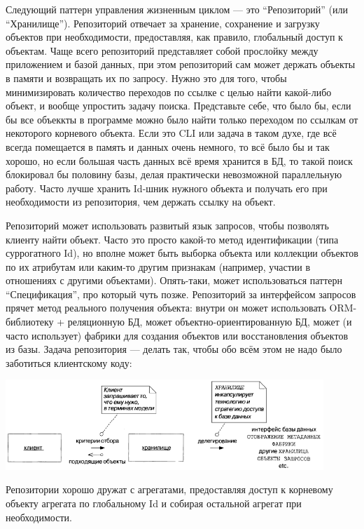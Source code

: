 \documentclass[a5paper]{article}
\begin{document}
Следующий паттерн управления жизненным циклом --- это ``Репозиторий'' (или ``Хранилище''). Репозиторий отвечает за хранение, сохранение и загрузку объектов при необходимости, предоставляя, как правило, глобальный доступ к объектам. Чаще всего репозиторий представляет собой прослойку между приложением и базой данных, при этом репозиторий сам может держать объекты в памяти и возвращать их по запросу. Нужно это для того, чтобы минимизировать количество переходов по ссылке с целью найти какой-либо объект, и вообще упростить задачу поиска. Представьте себе, что было бы, если бы все объеккты в программе можно было найти только переходом по ссылкам от некоторого корневого объекта. Если это CLI или задача в таком духе, где всё всегда помещается в память и данных очень немного, то всё было бы и так хорошо, но если большая часть данных всё время хранится в БД, то такой поиск блокировал бы половину базы, делая практически невозможной параллельную работу. Часто лучше хранить Id-шник нужного объекта и получать его при необходимости из репозитория, чем держать ссылку на объект.

Репозиторий может использовать развитый язык запросов, чтобы позволять клиенту найти объект. Часто это просто какой-то метод идентификации (типа суррогатного Id), но вполне может быть выборка объекта или коллекции объектов по их атрибутам или каким-то другим признакам (например, участии в отношениях с другими объектами). Опять-таки, может использоваться паттерн ``Спецификация'', про который чуть позже. Репозиторий за интерфейсом запросов прячет метод реального получения объекта: внутри он может использовать ORM-библиотеку + реляционную БД, может объектно-ориентированную БД, может (и часто использует) фабрики для создания объектов или восстановления объектов из базы. Задача репозитория --- делать так, чтобы обо всём этом не надо было заботиться клиентскому коду:

\begin{center}
    \includegraphics[width=0.9\textwidth]{repository.png}
\end{center}

Репозитории хорошо дружат с агрегатами, предоставляя доступ к корневому объекту агрегата по глобальному Id и собирая остальной агрегат при необходимости. 
\end{document}
